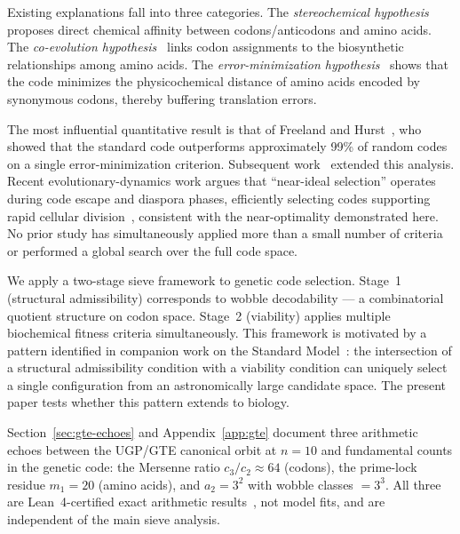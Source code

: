 \documentclass[10pt,twocolumn]{article}
\begin{document}
Existing explanations fall into three categories. The \emph{stereochemical
hypothesis}~\cite{Woese1965,Pelc1965} proposes direct chemical affinity between
codons/anticodons and amino acids. The \emph{co-evolution hypothesis}~\cite{Wong1975}
links codon assignments to the biosynthetic relationships among amino acids.
The \emph{error-minimization hypothesis}~\cite{FreelandHurst1998,Haig1991}
shows that the code minimizes the physicochemical distance of amino acids
encoded by synonymous codons, thereby buffering translation errors.

The most influential quantitative result is that of Freeland and
Hurst~\cite{FreelandHurst1998}, who showed that the standard code outperforms
approximately 99\% of random codes on a single error-minimization criterion.
Subsequent work~\cite{Knight2001,Freeland2003,Koonin2009} extended this analysis.
Recent evolutionary-dynamics work argues that ``near-ideal selection'' operates
during code escape and diaspora phases, efficiently selecting codes supporting
rapid cellular division~\cite{Yarus2024NearIdeal}, consistent with the
near-optimality demonstrated here.
No prior study has simultaneously applied more than a small number of criteria or
performed a global search over the full code space.

We apply a two-stage sieve framework to genetic code selection. Stage~1
(structural admissibility) corresponds to wobble decodability --- a
combinatorial quotient structure on codon space. Stage~2 (viability) applies
multiple biochemical fitness criteria simultaneously. This framework is
motivated by a pattern identified in companion work on the Standard Model~\cite{SpivackUGP,SpivackP24}:
the intersection of a structural admissibility condition with a viability condition
can uniquely select a single configuration from an astronomically large candidate space.
The present paper tests whether this pattern extends to biology.

Section~\ref{sec:gte-echoes} and Appendix~\ref{app:gte} document three
arithmetic echoes between the UGP/GTE canonical orbit at $n=10$ and
fundamental counts in the genetic code: the Mersenne ratio
$c_3/c_2 \approx 64$ (codons), the prime-lock residue $m_1 = 20$ (amino
acids), and $a_2 = 3^2$ with wobble classes $= 3^3$. All three are
Lean~4-certified exact arithmetic results~\cite{ugp-lean}, not model fits,
and are independent of the main sieve analysis.
\end{document}
